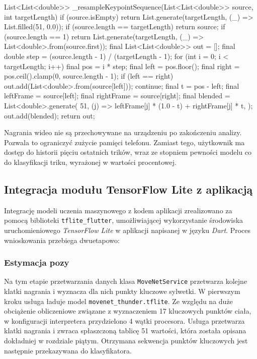         \begin{code}[
                language=Dart,
                caption={Algorytm \texttt{\_resampleKeypointSequence}.},
                label={lst:resampleKeypointSequence}
            ]
List<List<double>> _resampleKeypointSequence(List<List<double>> source,
int targetLength) {
if (source.isEmpty) {
    return List.generate(targetLength, (_) => List.filled(51, 0.0));
}
if (source.length == targetLength) return source;
if (source.length == 1) {
    return List.generate(targetLength, (_) => List<double>.from(source.first));
}
final List<List<double>> out = [];
final double step = (source.length - 1) / (targetLength - 1);
for (int i = 0; i < targetLength; i++) {
    final pos = i * step;
    final left = pos.floor();
    final right = pos.ceil().clamp(0, source.length - 1);
    if (left == right) {
    out.add(List<double>.from(source[left]));
    continue;
    }
    final t = pos - left;
    final leftFrame = source[left];
    final rightFrame = source[right];
    final blended = List<double>.generate(
    51,
    (j) => leftFrame[j] * (1.0 - t) + rightFrame[j] * t,
    );
    out.add(blended);
}
return out;}\end{code}
        Nagrania wideo nie są przechowywane na urządzeniu po zakończeniu analizy. Pozwala to ograniczyć zużycie pamięci telefonu. Zamiast tego, użytkownik ma dostęp do historii pięciu ostatnich trików, wraz ze stopniem pewności modelu co do klasyfikacji triku, wyrażonej w wartości procentowej.
    \subsection{Integracja modułu TensorFlow Lite z aplikacją}
 Integrację modeli uczenia maszynowego z kodem aplikacji zrealizowano za pomocą biblioteki \texttt{tflite\_flutter}, umożliwiającej wykorzystanie środowiska uruchomieniowego \textit{TensorFlow Lite} w aplikacji napisanej w języku \textit{Dart}. Proces wnioskowania przebiega dwuetapowo:            
            \subsubsection{Estymacja pozy}    
                Na tym etapie przetwarzania danych klasa \texttt{MoveNetService} przetwarza kolejne klatki nagrania i wyznacza dla nich punkty kluczowe sylwetki. W pierwszym kroku usługa ładuje model \texttt{movenet\_thunder.tflite}. Ze względu na duże obciążenie obliczeniowe związane z wyznaczeniem 17 kluczowych punktów ciała, w konfiguracji interpretera przydzielono 4 wątki procesora. Usługa przetwarza klatki nagrania i zwraca spłaszczoną tablicę 51 wartości, która została opisana dokładniej w rozdziale piątym. Otrzymana sekwencja punktów kluczowych jest następnie przekazywana do klasyfikatora.
